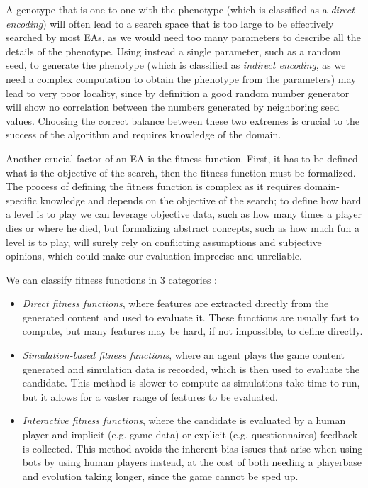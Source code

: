 \documentclass{Configuration_Files/PoliMi3i_thesis}
\begin{document}
A genotype that is one to one with the phenotype (which is classified as a \textit{direct encoding}) will often lead to a search space that is too large to be effectively searched by most EAs, as we would need too many parameters to describe all the details of the phenotype. Using instead a single parameter, such as a random seed, to generate the phenotype (which is classified as \textit{indirect encoding}, as we need a complex computation to obtain the phenotype from the parameters) may lead to very poor locality, since by definition a good random number generator will show no correlation between the numbers generated by neighboring seed values. Choosing the correct balance between these two extremes is crucial to the success of the algorithm and requires knowledge of the domain. \cite{togelius_search-based_2010}

Another crucial factor of an EA is the fitness function. First, it has to be defined what is the objective of the search, then the fitness function must be formalized. The process of defining the fitness function is complex as it requires domain-specific knowledge and depends on the objective of the search; to define how hard a level is to play we can leverage objective data, such as how many times a player dies or where he died, but formalizing abstract concepts, such as how much fun a level is to play, will surely rely on conflicting assumptions and subjective opinions, which could make our evaluation imprecise and unreliable. \cite{togelius_search-based_2010}

We can classify fitness functions in 3 categories \cite{togelius_search-based_2010}:
\begin{itemize}
    \item \textit{Direct fitness functions}, where features are extracted directly from the generated content and used to evaluate it. These functions are usually fast to compute, but many features may be hard, if not impossible, to define directly.
    \item \textit{Simulation-based fitness functions}, where an agent plays the game content generated and simulation data is recorded, which is then used to evaluate the candidate. This method is slower to compute as simulations take time to run, but it allows for a vaster range of features to be evaluated. 
    \item \textit{Interactive fitness functions}, where the candidate is evaluated by a human player and implicit (e.g. game data) or explicit (e.g. questionnaires) feedback is collected. This method avoids the inherent bias issues that arise when using bots by using human players instead, at the cost of both needing a playerbase and evolution taking longer, since the game cannot be sped up.  
\end{itemize}
\end{document}
